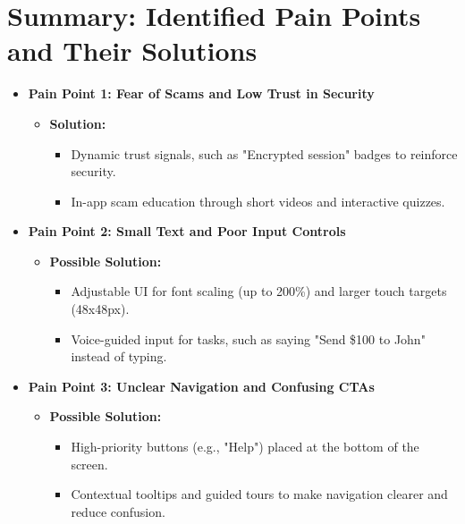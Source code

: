 \documentclass[a4paper,12pt]{report}
\begin{document}
\section{Summary: Identified Pain Points and Their Solutions}
\begin{itemize}
  \item \textbf{Pain Point 1: Fear of Scams and Low Trust in Security}
        \begin{itemize}
          \item \textbf{Solution:}
                \begin{itemize}
                  \item Dynamic trust signals, such as "Encrypted session" badges to reinforce security.
                  \item In-app scam education through short videos and interactive quizzes.
                \end{itemize}
        \end{itemize}

  \item \textbf{Pain Point 2: Small Text and Poor Input Controls}
        \begin{itemize}
          \item \textbf{Possible Solution:}
                \begin{itemize}
                  \item Adjustable UI for font scaling (up to 200\%) and larger touch targets (48x48px).
                  \item Voice-guided input for tasks, such as saying "Send \$100 to John" instead of typing.
                \end{itemize}
        \end{itemize}

  \item \textbf{Pain Point 3: Unclear Navigation and Confusing CTAs}
        \begin{itemize}
          \item \textbf{Possible Solution:}
                \begin{itemize}
                  \item High-priority buttons (e.g., "Help") placed at the bottom of the screen.
                  \item Contextual tooltips and guided tours to make navigation clearer and reduce confusion.
                \end{itemize}
        \end{itemize}


\end{itemize}
\end{document}
